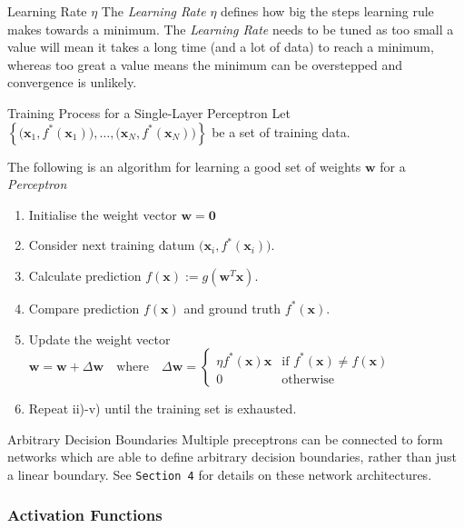 \documentclass[11pt,a4paper]{article}
\begin{document}
  \begin{remark}{Learning Rate $\eta$}
    The \textit{Learning Rate} $\eta$ defines how big the steps learning rule makes towards a minimum. The \textit{Learning Rate} needs to be tuned as too small a value will mean it takes a long time (and a lot of data) to reach a minimum, whereas too great a value means the minimum can be overstepped and convergence is unlikely.
  \end{remark}

  \begin{proposition}{Training Process for a Single-Layer Perceptron}
    Let $\left\{\big(\pmb{x}_1,f^*(\pmb{x}_1)\big),\dots,\big(\pmb{x}_N,f^*(\pmb{x}_N)\big)\right\}$ be a set of training data.
    \par The following is an algorithm for learning a good set of weights $\pmb{w}$ for a \textit{Perceptron}
    \begin{enumerate}
      \item Initialise the weight vector $\pmb{w}=\pmb0$
      \item Consider next training datum $\big(\pmb{x}_i,f^*(\pmb{x}_i)\big)$.
      \item Calculate prediction $f(\pmb{x}):=g(\mathbf{w}^T\mathbf{x})$.
      \item Compare prediction $f(\pmb{x})$ and ground truth $f^*(\pmb{x})$.
      \item Update the weight vector $\pmb{w}=\pmb{w}+\Delta\pmb{w}\quad\text{where}\quad\Delta\pmb{w}=\begin{cases}\eta f^*(\pmb{x})\pmb{x}&\text{if }f^*(\pmb{x})\neq f(\pmb{x})\\0&\text{otherwise}\end{cases}$
      \item Repeat ii)-v) until the training set is exhausted.
    \end{enumerate}
  \end{proposition}

  \begin{remark}{Arbitrary Decision Boundaries}
    Multiple preceptrons can be connected to form networks which are able to define arbitrary decision boundaries, rather than just a linear boundary. See \texttt{Section 4} for details on these network architectures.
  \end{remark}

\subsubsection{Activation Functions} \label{sec_ActivationFunctions}
\end{document}
